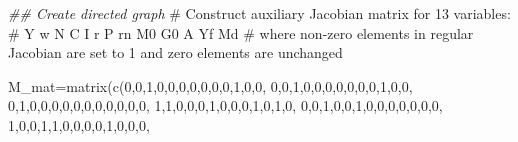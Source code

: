 \documentclass[
  letterpaper,
  DIV=11,
  numbers=noendperiod]{scrreprt}
\newenvironment{Shaded}{\begin{snugshade}}{\end{snugshade}}
\newcommand{\CommentTok}[1]{\textcolor[rgb]{0.37,0.37,0.37}{#1}}
\newcommand{\DecValTok}[1]{\textcolor[rgb]{0.68,0.00,0.00}{#1}}
\newcommand{\DocumentationTok}[1]{\textcolor[rgb]{0.37,0.37,0.37}{\textit{#1}}}
\newcommand{\FunctionTok}[1]{\textcolor[rgb]{0.28,0.35,0.67}{#1}}
\newcommand{\NormalTok}[1]{\textcolor[rgb]{0.00,0.23,0.31}{#1}}
\newcommand{\OtherTok}[1]{\textcolor[rgb]{0.00,0.23,0.31}{#1}}
\begin{document}
\begin{Shaded}
\begin{Highlighting}[]
\DocumentationTok{\#\# Create directed graph}
\CommentTok{\# Construct auxiliary Jacobian matrix for 13 variables: }
\CommentTok{\# Y w   N   C   I   r   P   rn M0   G0 A Yf Md}
\CommentTok{\# where non{-}zero elements in regular Jacobian are set to 1 and zero elements are unchanged}

\NormalTok{M\_mat}\OtherTok{=}\FunctionTok{matrix}\NormalTok{(}\FunctionTok{c}\NormalTok{(}\DecValTok{0}\NormalTok{,}\DecValTok{0}\NormalTok{,}\DecValTok{1}\NormalTok{,}\DecValTok{0}\NormalTok{,}\DecValTok{0}\NormalTok{,}\DecValTok{0}\NormalTok{,}\DecValTok{0}\NormalTok{,}\DecValTok{0}\NormalTok{,}\DecValTok{0}\NormalTok{,}\DecValTok{0}\NormalTok{,}\DecValTok{1}\NormalTok{,}\DecValTok{0}\NormalTok{,}\DecValTok{0}\NormalTok{,}
              \DecValTok{0}\NormalTok{,}\DecValTok{0}\NormalTok{,}\DecValTok{1}\NormalTok{,}\DecValTok{0}\NormalTok{,}\DecValTok{0}\NormalTok{,}\DecValTok{0}\NormalTok{,}\DecValTok{0}\NormalTok{,}\DecValTok{0}\NormalTok{,}\DecValTok{0}\NormalTok{,}\DecValTok{0}\NormalTok{,}\DecValTok{1}\NormalTok{,}\DecValTok{0}\NormalTok{,}\DecValTok{0}\NormalTok{,}
              \DecValTok{0}\NormalTok{,}\DecValTok{1}\NormalTok{,}\DecValTok{0}\NormalTok{,}\DecValTok{0}\NormalTok{,}\DecValTok{0}\NormalTok{,}\DecValTok{0}\NormalTok{,}\DecValTok{0}\NormalTok{,}\DecValTok{0}\NormalTok{,}\DecValTok{0}\NormalTok{,}\DecValTok{0}\NormalTok{,}\DecValTok{0}\NormalTok{,}\DecValTok{0}\NormalTok{,}\DecValTok{0}\NormalTok{,}
              \DecValTok{1}\NormalTok{,}\DecValTok{1}\NormalTok{,}\DecValTok{0}\NormalTok{,}\DecValTok{0}\NormalTok{,}\DecValTok{0}\NormalTok{,}\DecValTok{1}\NormalTok{,}\DecValTok{0}\NormalTok{,}\DecValTok{0}\NormalTok{,}\DecValTok{0}\NormalTok{,}\DecValTok{1}\NormalTok{,}\DecValTok{0}\NormalTok{,}\DecValTok{1}\NormalTok{,}\DecValTok{0}\NormalTok{,}
              \DecValTok{0}\NormalTok{,}\DecValTok{0}\NormalTok{,}\DecValTok{1}\NormalTok{,}\DecValTok{0}\NormalTok{,}\DecValTok{0}\NormalTok{,}\DecValTok{1}\NormalTok{,}\DecValTok{0}\NormalTok{,}\DecValTok{0}\NormalTok{,}\DecValTok{0}\NormalTok{,}\DecValTok{0}\NormalTok{,}\DecValTok{0}\NormalTok{,}\DecValTok{0}\NormalTok{,}\DecValTok{0}\NormalTok{,}
              \DecValTok{1}\NormalTok{,}\DecValTok{0}\NormalTok{,}\DecValTok{0}\NormalTok{,}\DecValTok{1}\NormalTok{,}\DecValTok{1}\NormalTok{,}\DecValTok{0}\NormalTok{,}\DecValTok{0}\NormalTok{,}\DecValTok{0}\NormalTok{,}\DecValTok{0}\NormalTok{,}\DecValTok{1}\NormalTok{,}\DecValTok{0}\NormalTok{,}\DecValTok{0}\NormalTok{,}\DecValTok{0}\NormalTok{,}

\end{Highlighting}
\end{Shaded}
\end{document}
